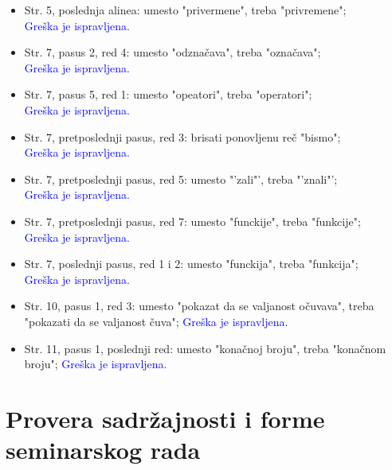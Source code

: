 \documentclass[a4paper]{report}
\newcommand{\odgovor}[1]{\textcolor{blue}{#1}}
\begin{document}
\begin{itemize}
  \item Str. 5, poslednja alinea: umesto "privermene", treba "privremene";\\
  \odgovor{Greška je ispravljena.}
  \item Str. 7, pasus 2, red 4: umesto "odznačava", treba "označava";\\
  \odgovor{Greška je ispravljena.}
  \item Str. 7, pasus 5, red 1: umesto "opeatori", treba "operatori";\\
  \odgovor{Greška je ispravljena.}
  \item Str. 7, pretposlednji pasus, red 3: brisati ponovljenu reč "bismo";\\
  \odgovor{Greška je ispravljena.}
  \item Str. 7, pretposlednji pasus, red 5: umesto "'zali"', treba "'znali"';\\
  \odgovor{Greška je ispravljena.}
  \item Str. 7, pretposlednji pasus, red 7: umesto "funckije", treba "funkcije";\\
  \odgovor{Greška je ispravljena.}
  \item Str. 7, poslednji pasus, red 1 i 2: umesto "funckija", treba "funkcija";\\
  \odgovor{Greška je ispravljena.}
  \item Str. 10, pasus 1, red 3: umesto "pokazat da se valjanost očuvava", treba "pokazati da se valjanost čuva";
  \odgovor{Greška je ispravljena.}
  \item Str. 11, pasus 1, poslednji red: umesto "konačnoj broju", treba "konačnom broju";
  \odgovor{Greška je ispravljena.}
\end{itemize}



\section{Provera sadržajnosti i forme seminarskog rada}
\end{document}

